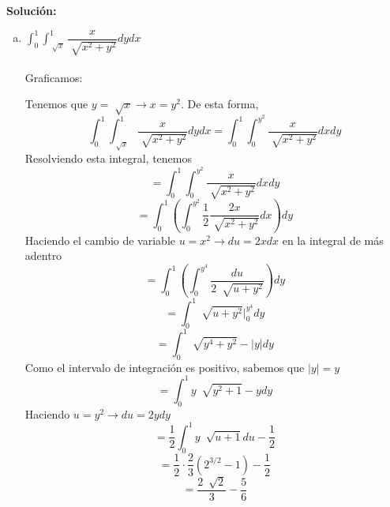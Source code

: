 \documentclass[12pt]{article}
\newenvironment{solucion}
{\begin{mdframed}[backgroundcolor=black!10]
		{\bf Solución:}\\
	}
	{
	\end{mdframed}
}
\newenvironment{preguntas}
{\begin{enumerate}\itemsep12pt
	}
	{
	\end{enumerate}
}
\newcommand{\ev}{\Big|}
\newcommand{\ra}{\rightarrow}
\begin{document}
\begin{preguntas}
\begin{solucion}
\begin{enumerate}[a)]
\item $\displaystyle\int_0^1 \displaystyle\int_{\sqrt[]{x}}^1 \dfrac{x}{\sqrt[]{x^2+y^2}} dydx$\\
			\\
			Graficamos:
			\begin{center}
			\end{center}
			Tenemos que $y=\sqrt[]{x} \ra x = y^2$. De esta forma,
			$$\displaystyle\int_0^1 \displaystyle\int_{\sqrt[]{x}}^1 \dfrac{x}{\sqrt[]{x^2+y^2}} dydx =
			\displaystyle\int_0^1 \displaystyle\int_0^{y^2} \dfrac{x}{\sqrt[]{x^2+y^2}} dxdy$$
			Resolviendo esta integral, tenemos
			$$= \displaystyle\int_0^1 \displaystyle\int_0^{y^2} \dfrac{x}{\sqrt[]{x^2+y^2}} dxdy$$
			$$= \displaystyle\int_0^1 \left( \displaystyle\int_0^{y^2} \dfrac{1}{2} \dfrac{2x}{\sqrt[]{x^2+y^2}} dx \right) dy$$
			Haciendo el cambio de variable $u=x^2 \ra du = 2xdx$ en la integral de más adentro
			$$= \displaystyle\int_0^1 \left( \displaystyle\int_0^{y^4} \dfrac{du}{2\ \sqrt[]{u+y^2}} \right) dy$$
			$$= \displaystyle\int_0^1\sqrt[]{u+y^2} \ev_0^{y^4} dy$$
			$$= \displaystyle\int_0^1\sqrt[]{y^4+y^2} -|y| dy$$
			Como el intervalo de integración es positivo, sabemos que $|y| = y$
			$$= \displaystyle\int_0^1 y\ \sqrt[]{y^2+1} -y dy$$
			Haciendo $u=y^2 \ra du = 2ydy$
			$$= \dfrac{1}{2}\displaystyle\int_0^1 y\ \sqrt[]{u+1} du - \dfrac{1}{2}$$
			$$= \dfrac{1}{2} \cdot \dfrac{2}{3} (2^{3/2}-1) - \dfrac{1}{2}$$
			$$= \dfrac{2\ \sqrt[]{2}}{3} - \dfrac{5}{6}$$
\end{enumerate}
\end{solucion}
\end{preguntas}
\end{document}

